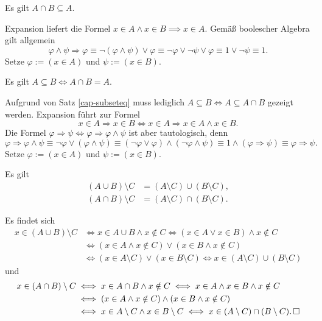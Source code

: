 \begin{Satz}\label{cap-subseteq}
Es gilt $A\cap B\subseteq A$.
\end{Satz}
\begin{Beweis}
Expansion liefert die Formel $x\in A\land x\in B\implies x\in A$.
Gemäß boolescher Algebra gilt allgemein
\[\varphi\land\psi\Rightarrow\varphi
\equiv \neg(\varphi\land\psi)\lor\varphi
\equiv \neg\varphi\lor\neg\psi\lor\varphi
\equiv 1\lor\neg\psi\equiv 1.\]
Setze $\varphi:=(x\in A)$ und $\psi:=(x\in B)$.\;\qedsymbol
\end{Beweis}

\begin{Satz}\label{subseteq-char}
Es gilt $A\subseteq B\iff A\cap B=A$.
\end{Satz}
\begin{Beweis}
Aufgrund von Satz \ref{cap-subseteq} muss lediglich
$A\subseteq B\iff A\subseteq A\cap B$ gezeigt werden.
Expansion führt zur Formel
\[x\in A\Rightarrow x\in B\iff x\in A\Rightarrow x\in A\land x\in B.\]
Die Formel $\varphi\Rightarrow\psi\iff\varphi\Rightarrow\varphi\land\psi$
ist aber tautologisch, denn
\[\varphi\Rightarrow\varphi\land\psi\equiv\neg\varphi\lor(\varphi\land\psi)
\equiv (\neg\varphi\lor\varphi)\land(\neg\varphi\land\psi)
\equiv 1\land(\varphi\Rightarrow\psi)\equiv \varphi\Rightarrow\psi.\]
Setze $\varphi:=(x\in A)$ und $\psi:=(x\in B)$.\;\qedsymbol
\end{Beweis}

\begin{Satz}\label{setdiff-dist}
Es gilt
\begin{align*}
(A\cup B)\setminus C &= (A\setminus C)\cup (B\setminus C),\\
(A\cap B)\setminus C &= (A\setminus C)\cap (B\setminus C).
\end{align*}
\end{Satz}
\begin{Beweis}
Es findet sich
\begin{align*}
x\in (A\cup B)\setminus C &\iff x\in A\cup B\land x\notin C
\iff (x\in A\lor x\in B)\land x\notin C\\
&\iff (x\in A\land x\notin C)\lor (x\in B\land x\notin C)\\
&\iff (x\in A\setminus C)\lor (x\in B\setminus C)
\iff x\in (A\setminus C)\cup (B\setminus C)
\end{align*}
und
\begin{align*}
x\in (A\cap B)\setminus C&\iff x\in A\cap B\land x\notin C
\iff x\in A\land x\in B\land x\notin C\\
&\iff (x\in A\land x\notin C)\land (x\in B\land x\notin C)\\
& \iff x\in A\setminus C\land x\in B\setminus C
\iff x\in (A\setminus C)\cap (B\setminus C).\,\square
\end{align*}
\end{Beweis}

